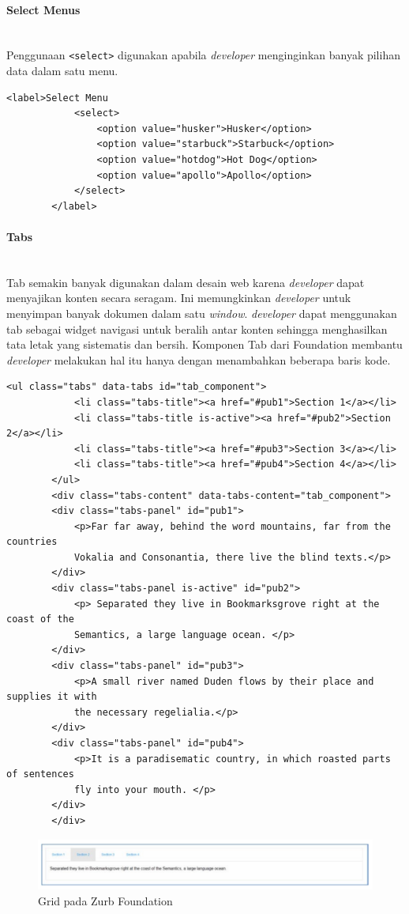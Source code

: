 \documentclass[a4paper,twoside]{article}
\newcommand{\myparagraph}[1]{\paragraph{#1}\mbox{}\\}
\begin{document}
\begin{enumerate}
		\myparagraph{Select Menus}
		Penggunaan \colorbox{mygray}{\texttt{<select>}} digunakan apabila \textit{developer} menginginkan banyak pilihan data dalam satu menu.
		\begin{lstlisting}[frame=single] 
		<label>Select Menu
			<select>
				<option value="husker">Husker</option>
				<option value="starbuck">Starbuck</option>
				<option value="hotdog">Hot Dog</option>
				<option value="apollo">Apollo</option>
			</select>
		</label>
		\end{lstlisting}
		
		
		\myparagraph{Tabs}
		Tab semakin banyak digunakan dalam desain web karena \textit{developer} dapat menyajikan konten secara seragam. Ini memungkinkan \textit{developer} untuk menyimpan banyak dokumen dalam satu \textit{window}. \textit{developer} dapat menggunakan tab sebagai widget navigasi untuk beralih antar konten sehingga menghasilkan tata letak yang sistematis dan bersih. Komponen Tab dari Foundation membantu \textit{developer} melakukan hal itu hanya dengan menambahkan beberapa baris kode. 
		
		\begin{lstlisting}[frame=single] 
		<ul class="tabs" data-tabs id="tab_component">
			<li class="tabs-title"><a href="#pub1">Section 1</a></li>
			<li class="tabs-title is-active"><a href="#pub2">Section 2</a></li>
			<li class="tabs-title"><a href="#pub3">Section 3</a></li>
			<li class="tabs-title"><a href="#pub4">Section 4</a></li>
		</ul>
		<div class="tabs-content" data-tabs-content="tab_component">
		<div class="tabs-panel" id="pub1">
			<p>Far far away, behind the word mountains, far from the countries
			Vokalia and Consonantia, there live the blind texts.</p>
		</div>
		<div class="tabs-panel is-active" id="pub2">
			<p> Separated they live in Bookmarksgrove right at the coast of the
			Semantics, a large language ocean. </p>
		</div>
		<div class="tabs-panel" id="pub3">
			<p>A small river named Duden flows by their place and supplies it with
			the necessary regelialia.</p>
		</div>
		<div class="tabs-panel" id="pub4">
			<p>It is a paradisematic country, in which roasted parts of sentences
			fly into your mouth. </p>
		</div>
		</div>
		\end{lstlisting}
		
		\begin{figure} [H]
			\centering  
			\includegraphics[scale=0.7]{tabs_component_zurb.png}  
			\caption{Grid pada Zurb Foundation}
		\end{figure}	
		

\end{enumerate}
\end{document}
